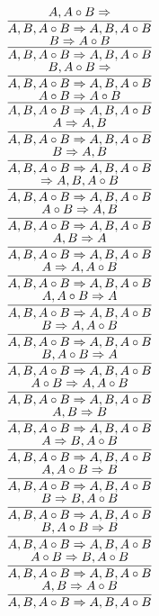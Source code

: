 \documentclass[11pt]{article}
\begin{document}
\begin{center}
\bigskip
\\$\infer{A, B, A\circ B\Rightarrow A, B, A\circ B}{A, A\circ B\Rightarrow }$
\bigskip
\\$\infer{A, B, A\circ B\Rightarrow A, B, A\circ B}{B\Rightarrow A\circ B}$
\bigskip
\\$\infer{A, B, A\circ B\Rightarrow A, B, A\circ B}{B, A\circ B\Rightarrow }$
\bigskip
\\$\infer{A, B, A\circ B\Rightarrow A, B, A\circ B}{A\circ B\Rightarrow A\circ B}$
\bigskip
\\$\infer{A, B, A\circ B\Rightarrow A, B, A\circ B}{A\Rightarrow A, B}$
\bigskip
\\$\infer{A, B, A\circ B\Rightarrow A, B, A\circ B}{B\Rightarrow A, B}$
\bigskip
\\$\infer{A, B, A\circ B\Rightarrow A, B, A\circ B}{\Rightarrow A, B, A\circ B}$
\bigskip
\\$\infer{A, B, A\circ B\Rightarrow A, B, A\circ B}{A\circ B\Rightarrow A, B}$
\bigskip
\\$\infer{A, B, A\circ B\Rightarrow A, B, A\circ B}{A, B\Rightarrow A}$
\bigskip
\\$\infer{A, B, A\circ B\Rightarrow A, B, A\circ B}{A\Rightarrow A, A\circ B}$
\bigskip
\\$\infer{A, B, A\circ B\Rightarrow A, B, A\circ B}{A, A\circ B\Rightarrow A}$
\bigskip
\\$\infer{A, B, A\circ B\Rightarrow A, B, A\circ B}{B\Rightarrow A, A\circ B}$
\bigskip
\\$\infer{A, B, A\circ B\Rightarrow A, B, A\circ B}{B, A\circ B\Rightarrow A}$
\bigskip
\\$\infer{A, B, A\circ B\Rightarrow A, B, A\circ B}{A\circ B\Rightarrow A, A\circ B}$
\bigskip
\\$\infer{A, B, A\circ B\Rightarrow A, B, A\circ B}{A, B\Rightarrow B}$
\bigskip
\\$\infer{A, B, A\circ B\Rightarrow A, B, A\circ B}{A\Rightarrow B, A\circ B}$
\bigskip
\\$\infer{A, B, A\circ B\Rightarrow A, B, A\circ B}{A, A\circ B\Rightarrow B}$
\bigskip
\\$\infer{A, B, A\circ B\Rightarrow A, B, A\circ B}{B\Rightarrow B, A\circ B}$
\bigskip
\\$\infer{A, B, A\circ B\Rightarrow A, B, A\circ B}{B, A\circ B\Rightarrow B}$
\bigskip
\\$\infer{A, B, A\circ B\Rightarrow A, B, A\circ B}{A\circ B\Rightarrow B, A\circ B}$
\bigskip
\\$\infer{A, B, A\circ B\Rightarrow A, B, A\circ B}{A, B\Rightarrow A\circ B}$

\end{center}
\end{document}

